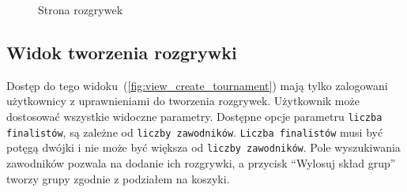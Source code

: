 \documentclass[shortabstract]{iithesis}
\begin{document}
\begin{figure}[H]
    \centering
    \hfill
    \caption{Strona rozgrywek}
    \label{fig:view_tournaments}
\end{figure}

\newpage
\subsection{Widok tworzenia rozgrywki}
Dostęp do tego widoku~(\ref{fig:view_create_tournament}) mają tylko zalogowani użytkownicy z uprawnieniami do tworzenia rozgrywek.
Użytkownik może dostosować wszystkie widoczne parametry. Dostępne opcje parametru \texttt{liczba finalistów}, są zależne od \texttt{liczby zawodników}.
\texttt{Liczba finalistów} musi być potęgą dwójki i nie może być większa od \texttt{liczby zawodników}.
Pole wyszukiwania zawodników pozwala na dodanie ich rozgrywki, a przycisk ``Wylosuj skład grup'' tworzy grupy zgodnie z podziałem na koszyki.
\end{document}
